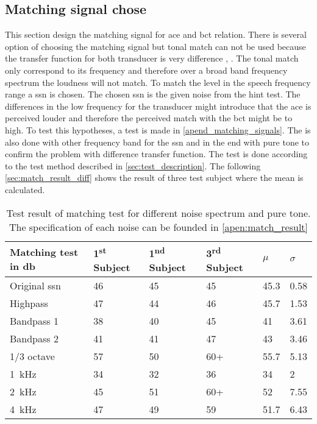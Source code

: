 \subsection{Matching signal chose}
\label{sec:match_sig_cho}
This section design the matching signal for \gls{ace} and \gls{bct} relation. There is several option of choosing the matching signal but tonal match can not be used because the transfer function for both transducer is very difference \citep{microPro_er4},  \citep{radioear_b81}. The tonal match only correspond to its frequency and therefore over a broad band frequency spectrum the loudness will not match. To match the level in the speech frequency range a \gls{ssn} is chosen. The chosen \gls{ssn} is the given noise from the \matlab \gls{hint} test. The differences in the low frequency for the transducer might introduce that the \gls{ace} is perceived louder and therefore the perceived match with the \gls{bct} might be to high. To test this hypotheses, a test is made in \autoref{apend_matching_signals}. The is also done with other frequency band for the \gls{ssn} and in the end with pure tone to confirm the problem with difference transfer function. The test is done according to the test method described in \autoref{sec:test_description}. The following \autoref{sec:match_result_diff} shows the result of three test subject where the mean is calculated.

\begin{table}[H]
\centering
\caption{Test result of matching test for different noise spectrum and pure tone. The specification of each noise can be founded in \autoref{apen:match_result}}
\begin{tabular}{l|lll|ll}
Matching test in \si{\decibel}       & 1\textsuperscript{st}  Subject & 1\textsuperscript{nd}  Subject & 3\textsuperscript{rd}  Subject & $\mu$ & $\sigma$ \\ \hline
Original \gls{ssn}         & 46        & 45        & 45        & 45.3        & 0.58               \\
Highpass         & 47        & 44        & 46        & 45.7        & 1.53               \\
Bandpass 1         & 38        & 40        & 45        & 41          & 3.61               \\
Bandpass 2        & 41        & 41        & 47        & 43          & 3.46               \\
1/3 octave & 57        & 50        & 60+       & 55.7        & 5.13               \\
\SI{1}{\kilo\hertz}                   & 34        & 32        & 36        & 34          & 2                  \\
\SI{2}{\kilo\hertz}                  & 45        & 51        & 60+       & 52          & 7.55               \\
\SI{4}{\kilo\hertz}                  & 47        & 49        & 59        & 51.7        &  6.43                 
\end{tabular}
\label{sec:match_result_diff}
\end{table}



